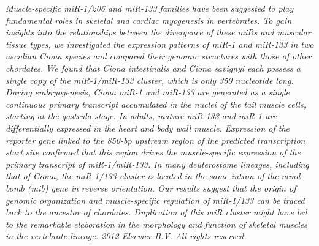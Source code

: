 \documentclass[graybox]{svmult}
\begin{document}
\cite{Kusakabe2013}
\textit{Muscle-specific miR-1/206 and miR-133 families have been suggested to play fundamental roles in skeletal and cardiac myogenesis in vertebrates. To gain insights into the relationships between the divergence of these miRs and muscular tissue types, we investigated the expression patterns of miR-1 and miR-133 in two ascidian Ciona species and compared their genomic structures with those of other chordates. We found that Ciona intestinalis and Ciona savignyi each possess a single copy of the miR-1/miR-133 cluster, which is only 350 nucleotide long. During embryogenesis, Ciona miR-1 and miR-133 are generated as a single continuous primary transcript accumulated in the nuclei of the tail muscle cells, starting at the gastrula stage. In adults, mature miR-133 and miR-1 are differentially expressed in the heart and body wall muscle. Expression of the reporter gene linked to the 850-bp upstream region of the predicted transcription start site confirmed that this region drives the muscle-specific expression of the primary transcript of miR-1/miR-133. In many deuterostome lineages, including that of Ciona, the miR-1/133 cluster is located in the same intron of the mind bomb (mib) gene in reverse orientation. Our results suggest that the origin of genomic organization and muscle-specific regulation of miR-1/133 can be traced back to the ancestor of chordates. Duplication of this miR cluster might have led to the remarkable elaboration in the morphology and function of skeletal muscles in the vertebrate lineage. {\textcopyright} 2012 Elsevier B.V. All rights reserved.}
\end{document}
